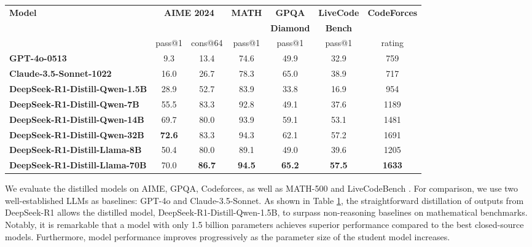 \documentclass[11pt, a4paper, logo, copyright, nonumbering]{deepseek}
\begin{document}
\begin{CJK*}{UTF8}{gbsn}
\label{sec:distilled_model_evaluation}
\begin{table}[h]
    \centering
    \setlength{\tabcolsep}{2pt}
    \label{tab:distill}
        \begin{tabularx}{\textwidth}{@{}l *{6}{c}@{}}
        \toprule
        \multirow{3}{*}{\centering\textbf{Model}} & \multicolumn{2}{c}{\multirow{2}{*}{\textbf{\footnotesize{AIME 2024}}}} & \multirow{2}{*}{\textbf{\footnotesize{MATH}}} & \textbf{\footnotesize{GPQA}} & \textbf{\footnotesize{LiveCode}} & \multirow{2}{*}{\footnotesize{\textbf{CodeForces}}} \\
        &  &  &  & \textbf{\footnotesize{Diamond}} & \textbf{\footnotesize{Bench}} & \\
        \cmidrule(lr){2-3}
         & pass@1 & cons@64 & pass@1 & pass@1 & pass@1 & rating \\
        \midrule
        \textbf{GPT-4o-0513} & 9.3 & 13.4 & 74.6  & 49.9 & 32.9 &  759\\
        \textbf{Claude-3.5-Sonnet-1022} & 16.0 & 26.7 & 78.3  & 65.0 & 38.9 &  717\\
        \midrule
        \textbf{DeepSeek-R1-Distill-Qwen-1.5B} & 28.9 & 52.7 & 83.9 & 33.8 & 16.9 & 954 \\
        \textbf{DeepSeek-R1-Distill-Qwen-7B} & 55.5 & 83.3 & 92.8 & 49.1 & 37.6 & 1189 \\
        \textbf{DeepSeek-R1-Distill-Qwen-14B} & 69.7 & 80.0 & 93.9 &  59.1 & 53.1 & 1481 \\
        \textbf{DeepSeek-R1-Distill-Qwen-32B} & \textbf{72.6} & {83.3} & {94.3} & {62.1} & {57.2} & 1691 \\
        \textbf{DeepSeek-R1-Distill-Llama-8B} & 50.4 & 80.0 & 89.1 & 49.0 & 39.6 & 1205 \\
        \textbf{DeepSeek-R1-Distill-Llama-70B} & 70.0 & \textbf{86.7} & \textbf{94.5} & \textbf{65.2} & \textbf{57.5} & \textbf{1633} \\
        \bottomrule
    \end{tabularx}
\end{table}
We evaluate the distilled models on AIME, GPQA, Codeforces, as well as MATH-500 \citep{lightman2023let} and LiveCodeBench \citep{livecodebench}. For comparison, we use two well-established LLMs as baselines: GPT-4o and Claude-3.5-Sonnet. As shown in Table \ref{tab:distill}, the straightforward distillation of outputs from DeepSeek-R1 allows the distilled model, DeepSeek-R1-Distill-Qwen-1.5B, to surpass non-reasoning baselines on mathematical benchmarks. Notably, it is remarkable that a model with only 1.5 billion parameters achieves superior performance compared to the best closed-source models.
Furthermore, model performance improves progressively as the parameter size of the student model increases.


\end{CJK*}
\end{document}
